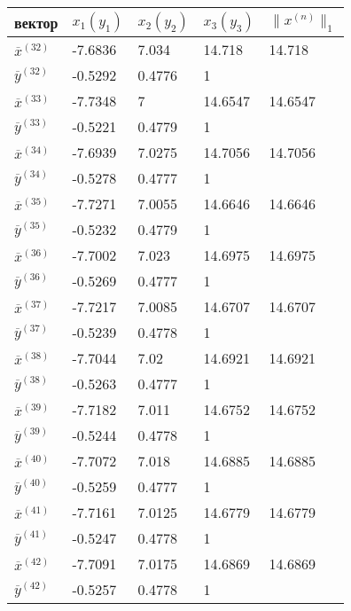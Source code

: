\documentclass[10pt, a4paper]{scrartcl}
\begin{document}
\pagebreak

\begin{center}
\begin{tabular}{ | l  | l  | l  | l  | l |}
\hline
вектор & $x_1(y_1)$ & $x_2(y_2)$ & $x_3(y_3)$ & $\parallel x^{(n)} \parallel _1$ \\ \hline
$\overline{x}^{(32)}$ & -7.6836 & 7.034 & 14.718 & 14.718 \\ \hline
$\overline{y}^{(32)}$ & -0.5292 & 0.4776 & 1 &   \\ \hline
$\overline{x}^{(33)}$ & -7.7348 & 7 & 14.6547 & 14.6547 \\ \hline
$\overline{y}^{(33)}$ & -0.5221 & 0.4779 & 1 &   \\ \hline
$\overline{x}^{(34)}$ & -7.6939 & 7.0275 & 14.7056 & 14.7056 \\ \hline
$\overline{y}^{(34)}$ & -0.5278 & 0.4777 & 1 &   \\ \hline
$\overline{x}^{(35)}$ & -7.7271 & 7.0055 & 14.6646 & 14.6646 \\ \hline
$\overline{y}^{(35)}$ & -0.5232 & 0.4779 & 1 &   \\ \hline
$\overline{x}^{(36)}$ & -7.7002 & 7.023 & 14.6975 & 14.6975 \\ \hline
$\overline{y}^{(36)}$ & -0.5269 & 0.4777 & 1 &   \\ \hline
$\overline{x}^{(37)}$ & -7.7217 & 7.0085 & 14.6707 & 14.6707 \\ \hline
$\overline{y}^{(37)}$ & -0.5239 & 0.4778 & 1 &   \\ \hline
$\overline{x}^{(38)}$ & -7.7044 & 7.02 & 14.6921 & 14.6921 \\ \hline
$\overline{y}^{(38)}$ & -0.5263 & 0.4777 & 1 &   \\ \hline
$\overline{x}^{(39)}$ & -7.7182 & 7.011 & 14.6752 & 14.6752 \\ \hline
$\overline{y}^{(39)}$ & -0.5244 & 0.4778 & 1 &   \\ \hline
$\overline{x}^{(40)}$ & -7.7072 & 7.018 & 14.6885 & 14.6885 \\ \hline
$\overline{y}^{(40)}$ & -0.5259 & 0.4777 & 1 &   \\ \hline
$\overline{x}^{(41)}$ & -7.7161 & 7.0125 & 14.6779 & 14.6779 \\ \hline
$\overline{y}^{(41)}$ & -0.5247 & 0.4778 & 1 &   \\ \hline
$\overline{x}^{(42)}$ & -7.7091 & 7.0175 & 14.6869 & 14.6869 \\ \hline
$\overline{y}^{(42)}$ & -0.5257 & 0.4778 & 1 &   \\ \hline
\end{tabular}
\end{center}
\end{document}
